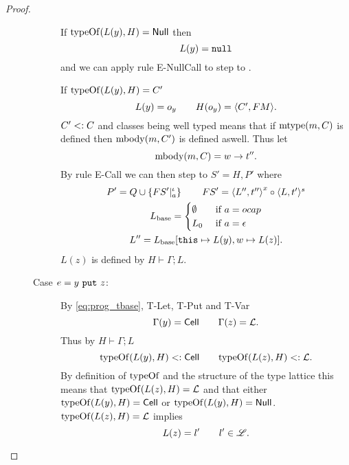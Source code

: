 \begin{proof}
\begin{description}
\begin{description}
          If $\mbox{$\mathrm{typeOf}$}(L(y), H) = \mbox{$\mathsf{Null}$}$ then
          \begin{equation*}
            L(y) = \mbox{\mdseries\texttt{null}}
          \end{equation*}
          and we can apply rule {\sc E-NullCall} to step to \Error.
          \contradiction

          If $\mbox{$\mathrm{typeOf}$}(L(y), H) = C'$
          \begin{equation*}
            L(y) = o_y \quad\quad H(o_y) = \mbox{$\langle C', FM \rangle$}.
          \end{equation*}
          $C' <: C$ and classes being well typed means that if $\mbox{$\mathrm{mtype}$}(m, C)$
          is defined then $\mbox{$\mathrm{mbody}$}(m, C')$ is defined aswell. Thus let
          \begin{equation*}
            \mbox{$\mathrm{mbody}$}(m, C) = w \to t''.
          \end{equation*}
          By rule {\sc E-Call} we can then step to $S' = H, P'$ where
          \begin{equation*}
            \begin{gathered}
              P' = Q \cup \left\{FS'|_a^\iota \right\} \quad\quad FS' = \mbox{$\langle L'',
              t'' \rangle$}^x \circ \mbox{$\langle L, t' \rangle^s$} \\
              L_{\text{base}} =
              \begin{cases}
                \emptyset & \text{ if } a = \mbox{$ocap$} \\
                L_0       & \text{ if } a = \mbox{$\epsilon$}
              \end{cases} \\
              L'' = L_{\text{base}}[\mbox{\mdseries\texttt{this}} \mapsto L(y), w \mapsto L(z)].
            \end{gathered}
          \end{equation*}
          $L(z)$ is defined by $H \vdash \Gamma; L$. \contradiction

        \item[Case $e = \mbox{\mdseries$y$~\texttt{put}~$z$}$:]
          By \eqref{eq:prog_tbase}, {\sc T-Let}, {\sc T-Put} and {\sc T-Var}
          \begin{equation*}
            \Gamma(y) = \mbox{$\mathsf{Cell}$} \quad\quad \Gamma(z) = \mbox{$\mathcal{L}$}.
          \end{equation*}
          Thus by $H \vdash \Gamma; L$
          \begin{equation*}
            \mbox{$\mathrm{typeOf}$}(L(y), H) <: \mbox{$\mathsf{Cell}$} \quad\quad \mbox{$\mathrm{typeOf}$}(L(z), H) <:
            \mbox{$\mathcal{L}$}.
          \end{equation*}
          By definition of $\mbox{$\mathrm{typeOf}$}$ and the structure of the type lattice this
          means that $\mbox{$\mathrm{typeOf}$}(L(z), H) = \mbox{$\mathcal{L}$}$ and that either
          $\mbox{$\mathrm{typeOf}$}(L(y), H) = \mbox{$\mathsf{Cell}$}$ or $\mbox{$\mathrm{typeOf}$}(L(y), H) = \mbox{$\mathsf{Null}$}$. \\
          $\mbox{$\mathrm{typeOf}$}(L(z), H) = \mbox{$\mathcal{L}$}$ implies
          \begin{equation*}
            L(z) = l' \quad\quad l' \in \mbox{$\mathscr{L}$}.
          \end{equation*}


\end{description}
\end{description}
\end{proof}
